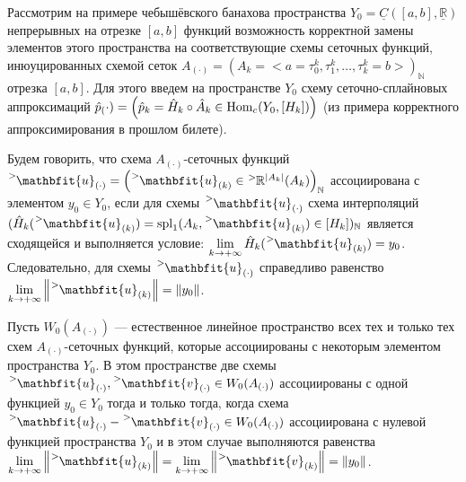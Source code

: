 
Рассмотрим на примере чебышёвского банахова пространства $Y_0 = \underline{C}([a, b], \underline{\mathbb{R}})$ непрерывных на отрезке $[a, b]$ функций возможность корректной замены элементов этого пространства на соответствующие схемы сеточных функций, инюуцированных схемой сеток $A_{(\cdot)} = \left(A_k = \big<a = \tau_0^k, \tau_1^k, \dotsc, \tau_k^k = b\big>\right)_{\mathbb{N}}$ отрезка $[a, b]$. Для этого введем на пространстве $Y_0$ схему сеточно-сплайновых аппроксимаций $\hat{p}_(\cdot) = \left(\hat{p}_k = \hat{H}_k \circ \hat{A}_k \in \mathrm{Hom}_c(Y_0, [H_k])\right)$  (из примера корректного аппроксимирования в прошлом билете). 

Будем говорить, что схема $A_{(\cdot)}$-сеточных функций $\tensor[^{>}]{\mathbfit{u}}{_{(\cdot)}} = \left(\tensor[^{>}]{\mathbfit{u}}{_{(k)}} \in \tensor[^{>}]{\mathbb{R}}{^{\abs{A_k}}}(A_k)\right)_{\mathbb{N}}$ ассоциирована с элементом $y_0 \in Y_0$, если для схемы $\tensor[^{>}]{\mathbfit{u}}{_{(\cdot)}}$ схема интерполяций $(\hat{H}_k(\tensor[^{>}]{\mathbfit{u}}{_{(k)}}) = \spl_1(A_k, \tensor[^{>}]{\mathbfit{u}}{_{(k)}}) \in [H_k])_{\mathbb{N}}$ является сходящейся и выполняется условие: $\lim\limits_{k \to +\infty}{\hat{H}_k(\tensor[^{>}]{\mathbfit{u}}{_{(k)}})} = y_0$. Следовательно, для схемы $\tensor[^{>}]{\mathbfit{u}}{_{(\cdot)}}$ справедливо равенство $\lim\limits_{k \to +\infty}{\norm{\tensor[^{>}]{\mathbfit{u}}{_{(k)}}}} = \norm{y_0}$.

Пусть $W_0(A_{(\cdot)})$ --- естественное линейное пространство всех тех и только тех схем $A_{(\cdot)}$-сеточных функций, которые ассоциированы с некоторым элементом пространства $Y_0$. В этом пространстве две схемы $\tensor[^{>}]{\mathbfit{u}}{_{(\cdot)}}, \tensor[^{>}]{\mathbfit{v}}{_{(\cdot)}} \in W_0(A_{(\cdot)})$ ассоциированы с одной функцией $y_0 \in Y_0$ тогда и только тогда, когда схема $\tensor[^{>}]{\mathbfit{u}}{_{(\cdot)}} - \tensor[^{>}]{\mathbfit{v}}{_{(\cdot)}} \in W_0(A_{(\cdot)})$ ассоциирована с нулевой функцией пространства $Y_0$ и в этом случае выполняются равенства $\lim\limits_{k \to +\infty}{\norm{\tensor[^{>}]{\mathbfit{u}}{_{(k)}}}} = \lim\limits_{k \to +\infty}{\norm{\tensor[^{>}]{\mathbfit{v}}{_{(k)}}}} = \norm{y_0}$. 

